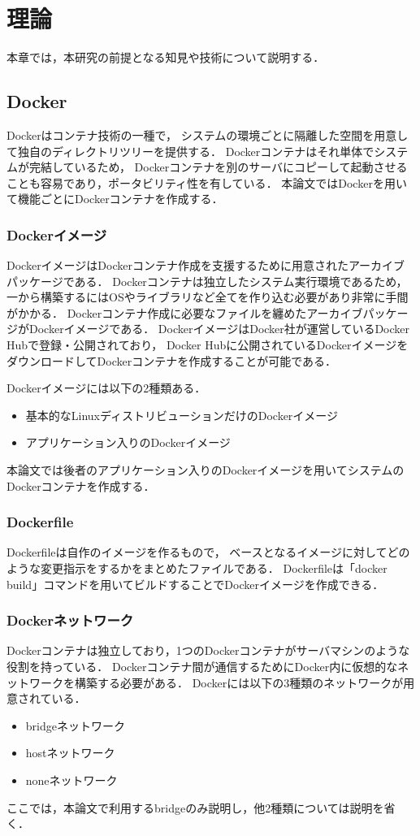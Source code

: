 \documentclass[12pt]{honka_v1}
\begin{document}
\fi
\section{理論}
本章では，本研究の前提となる知見や技術について説明する．
\subsection{Docker}
Dockerはコンテナ技術の一種で，
システムの環境ごとに隔離した空間を用意して独自のディレクトリツリーを提供する．
Dockerコンテナはそれ単体でシステムが完結しているため，
Dockerコンテナを別のサーバにコピーして起動させることも容易であり，ポータビリティ性を有している\cite{bib:docker-book}．
本論文ではDockerを用いて機能ごとにDockerコンテナを作成する．

\subsubsection{Dockerイメージ}
DockerイメージはDockerコンテナ作成を支援するために用意されたアーカイブパッケージである．
Dockerコンテナは独立したシステム実行環境であるため，
一から構築するにはOSやライブラリなど全てを作り込む必要があり非常に手間がかかる．
Dockerコンテナ作成に必要なファイルを纏めたアーカイブパッケージがDockerイメージである\cite{bib:docker-book}．
DockerイメージはDocker社が運営しているDocker Hubで登録・公開されており，
Docker Hubに公開されているDockerイメージをダウンロードしてDockerコンテナを作成することが可能である．

Dockerイメージには以下の2種類ある．
\begin{itemize}
    \item 基本的なLinuxディストリビューションだけのDockerイメージ
    \item アプリケーション入りのDockerイメージ
\end{itemize}

本論文では後者のアプリケーション入りのDockerイメージを用いてシステムのDockerコンテナを作成する．


\subsubsection{Dockerfile}
Dockerfileは自作のイメージを作るもので，
ベースとなるイメージに対してどのような変更指示をするかをまとめたファイルである．
Dockerfileは「docker build」コマンドを用いてビルドすることでDockerイメージを作成できる\cite{bib:docker-book}．

\subsubsection{Dockerネットワーク}
Dockerコンテナは独立しており，1つのDockerコンテナがサーバマシンのような役割を持っている．
Dockerコンテナ間が通信するためにDocker内に仮想的なネットワークを構築する必要がある．
Dockerには以下の3種類のネットワークが用意されている．
\begin{itemize}
    \item bridgeネットワーク
    \item hostネットワーク
    \item noneネットワーク
\end{itemize}
ここでは，本論文で利用するbridgeのみ説明し，他2種類については説明を省く．
\end{document}
